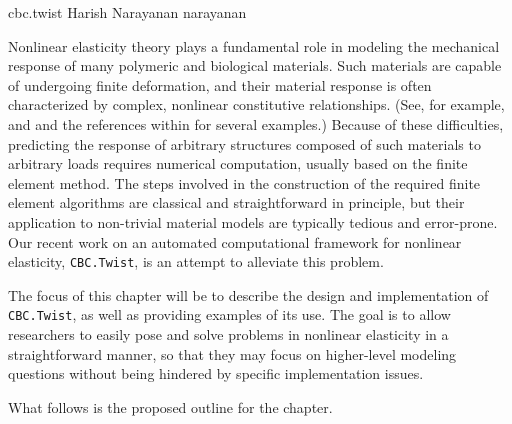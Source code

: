 \def\bone{{1}}
\def\Bepsilon{\mbox{$\epsilon$}}
\def\Bvarphi{\mbox{$\varphi$}}
\def\bB{\mbox{$ B$}}
\def\bC{\mbox{$ C$}}
\def\bE{\mbox{$ E$}}
\def\bF{\mbox{$ F$}}
\def\bN{\mbox{$ N$}}
\def\bP{\mbox{$ P$}}
\def\bS{\mbox{$ S$}}
\def\bT{\mbox{$ T$}}
\def\bX{\mbox{$ X$}}
\def\ba{\mbox{$ a$}}
\def\bb{\mbox{$ b$}}
\def\be{\mbox{$ e$}}
\def\bg{\mbox{$ g$}}
\def\br{\mbox{$ r$}}
\def\bu{\mbox{$ u$}}
\def\bv{\mbox{$ v$}}
\def\bw{\mbox{$ w$}}
\def\twist{{\tt CBC.Twist}}

{cbc.twist}
{Harish Narayanan}
{narayanan}

Nonlinear elasticity theory plays a fundamental role in modeling the
mechanical response of many polymeric and biological materials. Such
materials are capable of undergoing finite deformation, and their
material response is often characterized by complex, nonlinear
constitutive relationships. (See, for example, \cite{Holzapfel2000}
and \cite{TruesdellNoll1965} and the references within for several
examples.) Because of these difficulties, predicting the response of
arbitrary structures composed of such materials to arbitrary loads
requires numerical computation, usually based on the finite element
method. The steps involved in the construction of the required finite
element algorithms are classical and straightforward in principle, but
their application to non-trivial material models are typically tedious
and error-prone. Our recent work on an automated computational
framework for nonlinear elasticity, \twist, is an attempt to alleviate
this problem.

The focus of this chapter will be to describe the design and
implementation of \twist, as well as providing examples of its
use. The goal is to allow researchers to easily pose and solve
problems in nonlinear elasticity in a straightforward manner, so that
they may focus on higher-level modeling questions without being
hindered by specific implementation issues.

What follows is the proposed outline for the chapter.

